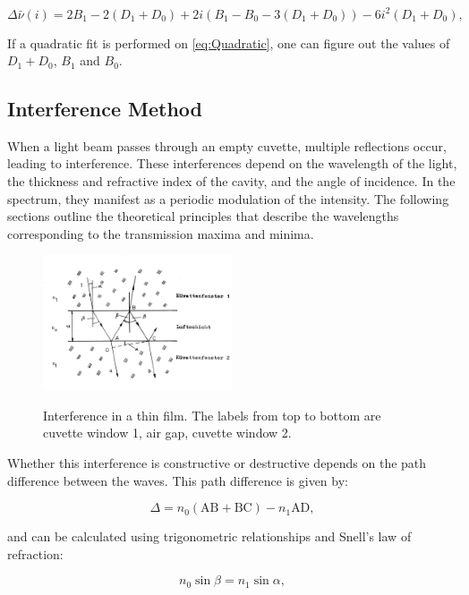 \documentclass{article}
\begin{document}
\begin{equation}
	\Delta \bar{\nu}(i) = 2B_1 - 2(D_1 + D_0) + 2i(B_1 - B_0 - 3(D_1 + D_0)) - 6i^2 (D_1 + D_0),
	\label{eq:Quadratic}
\end{equation}

If a quadratic fit is performed on \ref{eq:Quadratic}, one can figure out the values of $D_1 + D_0$, $B_1$ and $B_0$. 

\pagebreak{}

\subsection{Interference Method}

When a light beam passes through an empty cuvette, multiple reflections occur, leading to interference. These interferences depend on the wavelength of the light, the thickness and refractive index of the cavity, and the angle of incidence. In the spectrum, they manifest as a periodic modulation of the intensity. The following sections outline the theoretical principles that describe the wavelengths corresponding to the transmission maxima and minima.


\begin{figure}[h]
	\centering
	\includegraphics[width=0.5\textwidth]{Figures/Introduction/Interference.png}
	\label{fig:interference}
	\caption{Interference in a thin film. The labels from top to bottom are cuvette window 1, air gap, cuvette window 2.  \cite{riede_rotationvibration}}
\end{figure}

Whether this interference is constructive or destructive depends on the path difference between the waves. This path difference is given by:

\[
\Delta = n_0 (\text{AB} + \text{BC}) - n_1 \text{AD},
\]

and can be calculated using trigonometric relationships and Snell's law of refraction:

\[
n_0 \sin \beta = n_1 \sin \alpha,
\]
\end{document}
